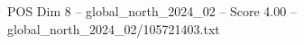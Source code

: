 \begin{textsample}{POS Dim 8 – global\_north\_2024\_02 – Score 4.00 – global\_north\_2024\_02/105721403.txt}
\end{textsample}
